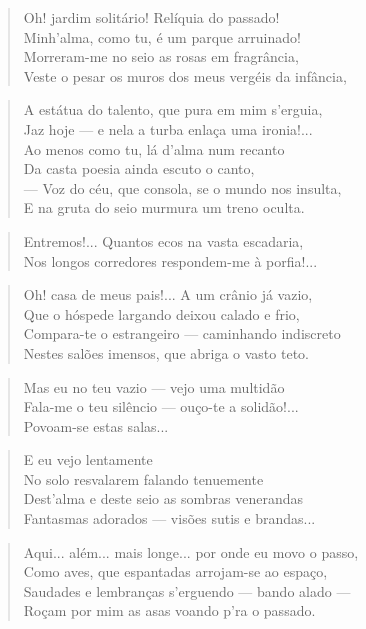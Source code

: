 \begin{anexosenv}
\begin{verse}
Oh! jardim solitário! Relíquia do passado! \\
Minh'alma, como tu, é um parque arruinado! \\
Morreram-me no seio as rosas em fragrância, \\
Veste o pesar os muros dos meus vergéis da infância, \\
\end{verse}

\begin{verse}
A estátua do talento, que pura em mim s'erguia, \\
Jaz hoje — e nela a turba enlaça uma ironia!... \\
Ao menos como tu, lá d'alma num recanto \\
Da casta poesia ainda escuto o canto, \\
— Voz do céu, que consola, se o mundo nos insulta, \\
E na gruta do seio murmura um treno oculta. \\
\end{verse}

\begin{verse}
Entremos!... Quantos ecos na vasta escadaria, \\
Nos longos corredores respondem-me à porfia!... \\
\end{verse}

\begin{verse}
Oh! casa de meus pais!... A um crânio já vazio, \\
Que o hóspede largando deixou calado e frio, \\
Compara-te o estrangeiro — caminhando indiscreto \\
Nestes salões imensos, que abriga o vasto teto. \\
\end{verse}

\begin{verse}
Mas eu no teu vazio — vejo uma multidão \\
Fala-me o teu silêncio — ouço-te a solidão!... \\
Povoam-se estas salas... \\
\end{verse}

\begin{verse}
E eu vejo lentamente \\
No solo resvalarem falando tenuemente \\
Dest'alma e deste seio as sombras venerandas \\
Fantasmas adorados — visões sutis e brandas... \\
\end{verse}

\begin{verse}
Aqui... além... mais longe... por onde eu movo o passo, \\
Como aves, que espantadas arrojam-se ao espaço, \\
Saudades e lembranças s'erguendo — bando alado — \\
Roçam por mim as asas voando p'ra o passado. \\
\end{verse}


\end{anexosenv}